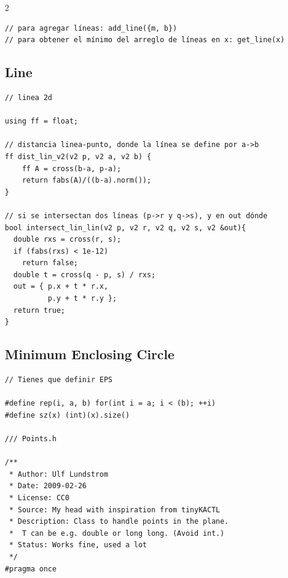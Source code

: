 \documentclass[twoside]{article}
\begin{document}
\begin{multicols*}{2}
\begin{verbatim}
// para agregar líneas: add_line({m, b})
// para obtener el mínimo del arreglo de líneas en x: get_line(x)

\end{verbatim}

	{
		\subsection*{Line}
	}
	\begin{verbatim}
// linea 2d

using ff = float;

// distancia linea-punto, donde la línea se define por a->b
ff dist_lin_v2(v2 p, v2 a, v2 b) {
    ff A = cross(b-a, p-a);
    return fabs(A)/((b-a).norm());
}

// si se intersectan dos líneas (p->r y q->s), y en out dónde
bool intersect_lin_lin(v2 p, v2 r, v2 q, v2 s, v2 &out){
  double rxs = cross(r, s);
  if (fabs(rxs) < 1e-12) 
    return false;
  double t = cross(q - p, s) / rxs;
  out = { p.x + t * r.x,
          p.y + t * r.y };
  return true;
}

\end{verbatim}

	{
		\subsection*{Minimum Enclosing Circle}
	}
	\begin{verbatim}
// Tienes que definir EPS

#define rep(i, a, b) for(int i = a; i < (b); ++i)
#define sz(x) (int)(x).size()

/// Points.h

/**
 * Author: Ulf Lundstrom
 * Date: 2009-02-26
 * License: CC0
 * Source: My head with inspiration from tinyKACTL
 * Description: Class to handle points in the plane.
 * 	T can be e.g. double or long long. (Avoid int.)
 * Status: Works fine, used a lot
 */
#pragma once


\end{verbatim}
\end{multicols*}
\end{document}
